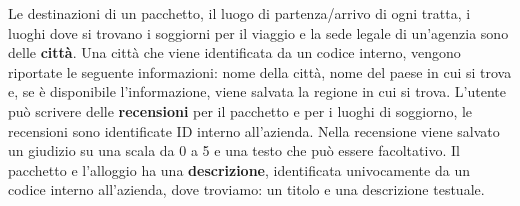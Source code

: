 %
%
Le destinazioni di un pacchetto, il luogo di partenza/arrivo di ogni tratta, i luoghi dove si trovano i soggiorni per il viaggio e la sede legale di un'agenzia sono delle \textbf{città}. Una città che viene identificata da un codice interno, vengono riportate le seguente informazioni: nome della città, nome del paese in cui si trova e, se è disponibile l'informazione, viene salvata la regione in cui si trova.
%
%
L'utente può scrivere delle \textbf{recensioni} per il pacchetto e per i luoghi di soggiorno, le recensioni sono identificate ID interno all'azienda. Nella recensione viene salvato un giudizio su una scala da 0 a 5 e una testo che può essere facoltativo.
%
%
Il pacchetto e l'alloggio ha una \textbf{descrizione}, identificata univocamente da un codice interno all'azienda, dove troviamo: un titolo e una descrizione testuale.
%


